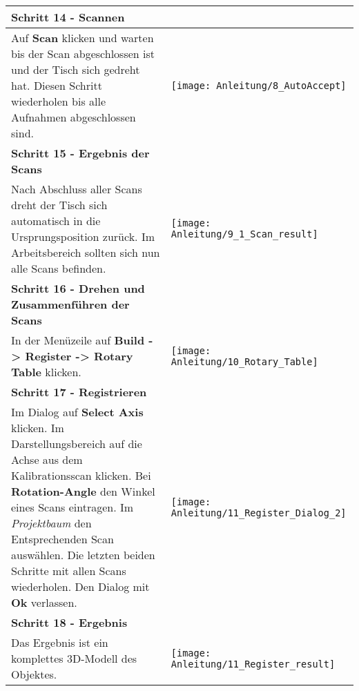 \begin{longtable}{|>{\RaggedRight}m{5cm}|m{8cm}|}
\multicolumn{2}{|l|}%
{{\textbf{Schritt 14 - Scannen}}}
\\ \hline
Auf \textbf{Scan} klicken und warten bis der Scan abgeschlossen ist und der Tisch sich gedreht hat.\linebreak
Diesen Schritt wiederholen bis alle Aufnahmen abgeschlossen sind.\linebreak
& 
\texttt{[image: Anleitung/8\_AutoAccept]}
\\ \hline  

\multicolumn{2}{|l|}%
{{\textbf{Schritt 15 - Ergebnis der Scans}}}
\\ \hline
Nach Abschluss aller Scans dreht der Tisch sich automatisch in die Ursprungsposition zurück.\linebreak
Im Arbeitsbereich sollten sich nun alle Scans befinden.
& 
\texttt{[image: Anleitung/9\_1\_Scan\_result]}
\\ \hline  

\multicolumn{2}{|l|}%
{{\textbf{Schritt 16 - Drehen und Zusammenführen der Scans}}}
\\ \hline
In der Menüzeile auf \textbf{Build -> Register -> Rotary Table} klicken.\linebreak
& 
\texttt{[image: Anleitung/10\_Rotary\_Table]}
\\ \hline  

\multicolumn{2}{|l|}%
{{\textbf{Schritt 17 - Registrieren}}}
\\ \hline
Im Dialog auf \textbf{Select Axis} klicken.\linebreak
Im Darstellungsbereich auf die Achse aus dem Kalibrationsscan klicken.
Bei \textbf{Rotation-Angle} den Winkel eines Scans eintragen.\linebreak
Im \emph{Projektbaum} den Entsprechenden Scan auswählen.\linebreak
Die letzten beiden Schritte mit allen Scans wiederholen.\linebreak
Den Dialog mit \textbf{Ok} verlassen.
& 
\texttt{[image: Anleitung/11\_Register\_Dialog\_2]}
\\ \hline  

\multicolumn{2}{|l|}%
{{\textbf{Schritt 18 - Ergebnis}}}
\\ \hline
Das Ergebnis ist ein komplettes 3D-Modell des Objektes.
& 
\texttt{[image: Anleitung/11\_Register\_result]}
\\ \hline  

\end{longtable} 